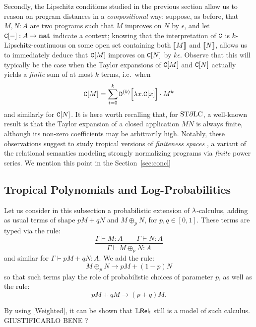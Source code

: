 Secondly, the Lipschitz conditions studied in the previous section allow us to reason on program distances in a \emph{compositional} way: suppose, as before, that $M,N:A$ are two programs such that $M$ improves on $N$ by $\epsilon$, and let $\mathtt{C}[-]:A \to \mathbf{nat}$ indicate a context; knowing that the interpretation of $\mathtt{C}$ is $k$-Lipschitz-continuous on some open set containing both $\llbracket M\rrbracket$ and $\llbracket N\rrbracket$, allows us to immediately deduce that $\mathtt{C}[M]$ improves on $\mathtt{C}[N]$ by $k \epsilon$. 
Observe that this will typically be the case when the Taylor expansions of $\mathtt{C}[M]$ and $\mathtt{C}[N]$ actually yields a \emph{finite} sum of at most $k$ terms, i.e.~when 
\begin{align}
\mathtt{C}[M] = \sum_{i=0}^{k} \mathtt{D}^{(k)}\Big[\lambda x.\mathtt{C}[x]\Big]\cdot M^{k}
\end{align}
and similarly for $\mathtt{C}[N]$. It is here worth recalling that, for $\mathrm{ST}\partial\mathrm{LC}$, a well-known result \cite{} is that the Taylor expansion of a closed application $MN$ is always finite, although its non-zero coefficients may be arbitrarily high. 
Notably, these observations suggest to study tropical versions of \emph{finiteness spaces} \cite{}, 
a variant of the relational semantics modeling strongly normalizing programs via \emph{finite} power series.
We mention this point in the Section~\ref{sec:concl}


\subsection{Tropical Polynomials and Log-Probabilities}

Let us consider in this subsection a probabilistic extension of $\lambda$-calculus, adding as usual terms of shape $pM+qN$ and $M\oplus_p N$, for $p,q\in[0,1]$.
These terms are typed via the rule:
\[
 \dfrac{\Gamma\vdash M:A \qquad \Gamma\vdash N:A}{\Gamma\vdash M\oplus_p N:A}
\]
and similar for $\Gamma\vdash pM+qN:A$.
We add the rule:
\[
 M\oplus_p N \to pM+(1-p)N
\]
so that such terms play the role of probabilistic choices of parameter $p$, as well as the rule:
\[
 pM+qM\to (p+q)M.
\]

\begin{remark}
{\color{red}By using [Weighted], it can be shown that $\mathbb{L} \mathsf{Rel}_!$ still is a model of such calculus. GIUSTIFICARLO BENE ?}
\end{remark}

